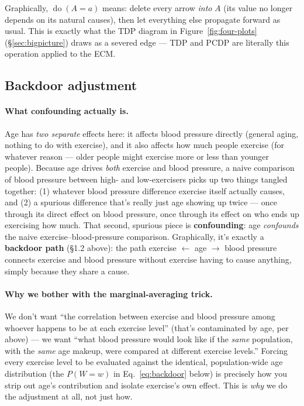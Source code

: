 Graphically, $\operatorname{do}(A=a)$ means: delete every arrow \emph{into}
$A$ (its value no longer depends on its natural causes), then let everything
else propagate forward as usual. This is exactly what the TDP diagram in
Figure~\ref{fig:four-plots} (\S\ref{sec:bigpicture}) draws as a severed edge
--- TDP and PCDP are literally this operation applied to the ECM.

\subsection{Backdoor adjustment}

\paragraph{What confounding actually is.} Age has \emph{two separate}
effects here: it affects blood pressure directly (general aging, nothing
to do with exercise), and it also affects how much people exercise (for
whatever reason --- older people might exercise more or less than younger
people). Because age drives \emph{both} exercise and blood pressure, a
naive comparison of blood pressure between high- and low-exercisers picks
up two things tangled together: (1) whatever blood pressure difference
exercise itself actually causes, and (2) a spurious difference that's
really just age showing up twice --- once through its direct effect on
blood pressure, once through its effect on who ends up exercising how
much. That second, spurious piece is \textbf{confounding}: age
\emph{confounds} the naive exercise--blood-pressure comparison.
Graphically, it's exactly a \textbf{backdoor path} (\S1.2 above): the path
exercise $\leftarrow$ age $\to$ blood pressure connects exercise and blood
pressure without exercise having to cause anything, simply because they
share a cause.

\paragraph{Why we bother with the marginal-averaging trick.} We don't want
``the correlation between exercise and blood pressure among whoever
happens to be at each exercise level'' (that's contaminated by age, per
above) --- we want ``what blood pressure would look like if the \emph{same}
population, with the \emph{same} age makeup, were compared at different
exercise levels.'' Forcing every exercise level to be evaluated against the
identical, population-wide age distribution (the $P(W=w)$ in
Eq.~\ref{eq:backdoor} below) is precisely how you strip out age's
contribution and isolate exercise's own effect. This is \emph{why} we do
the adjustment at all, not just how.


